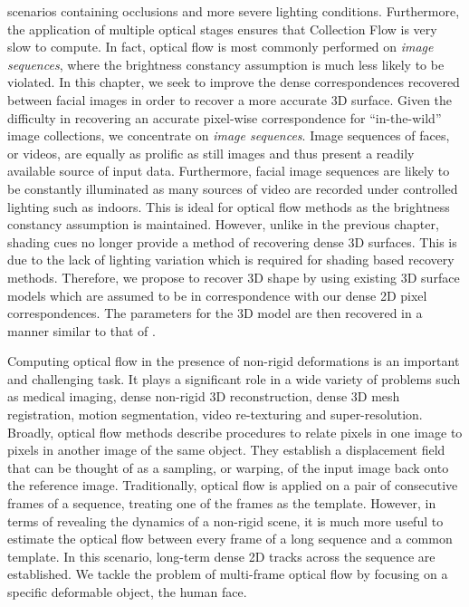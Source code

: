 scenarios containing occlusions and more severe lighting conditions.
Furthermore, the application of multiple optical stages ensures that Collection
Flow is very slow to compute. In fact, optical flow is most commonly performed
on \textit{image sequences}, where the brightness constancy assumption is
much less likely to be violated. In this chapter, we seek to improve the dense
correspondences recovered between facial images in order to recover a more
accurate 3D surface. Given the difficulty in recovering an accurate pixel-wise
correspondence for ``in-the-wild'' image collections, we concentrate on
\textit{image sequences}. Image sequences of faces, or videos, are equally
as prolific as still images and thus present a readily available source of
input data. Furthermore, facial image sequences are likely to be constantly
illuminated as many sources of video are recorded under controlled lighting such
as indoors. This is ideal for optical flow methods as the brightness constancy
assumption is maintained. However, unlike in the previous chapter, shading cues
no longer provide a method of recovering dense 3D surfaces. This is due
to the lack of lighting variation which is required for shading based
recovery methods. Therefore, we propose to recover 3D shape by using existing 3D
surface models which are assumed to be in correspondence with our dense 2D pixel
correspondences. The parameters for the 3D model are then recovered in a manner
similar to that of \citet{aldrian2010linear,aldrian2013inverse}.

Computing optical flow in the presence of non-rigid deformations
is an important and challenging task. It plays a significant role in a wide variety of 
problems such as medical imaging, dense non-rigid 3D reconstruction, 
dense 3D mesh registration, motion segmentation, video re-texturing and super-resolution.
Broadly, optical flow methods describe procedures to relate pixels in
one image to pixels in another image of the same object. They establish a 
displacement field that can be thought of as a sampling, or warping, of the input 
image back onto the reference image. Traditionally, optical flow is applied on a pair 
of consecutive frames of a sequence, treating one of the frames as the template.
However, in terms of revealing the dynamics of a non-rigid scene, it is much more 
useful to estimate the optical flow between every frame of a long sequence and a 
common template. In this scenario, long-term dense 2D tracks across the sequence are established. 
We tackle the problem of multi-frame optical flow by focusing on a 
specific deformable object, the human face.

